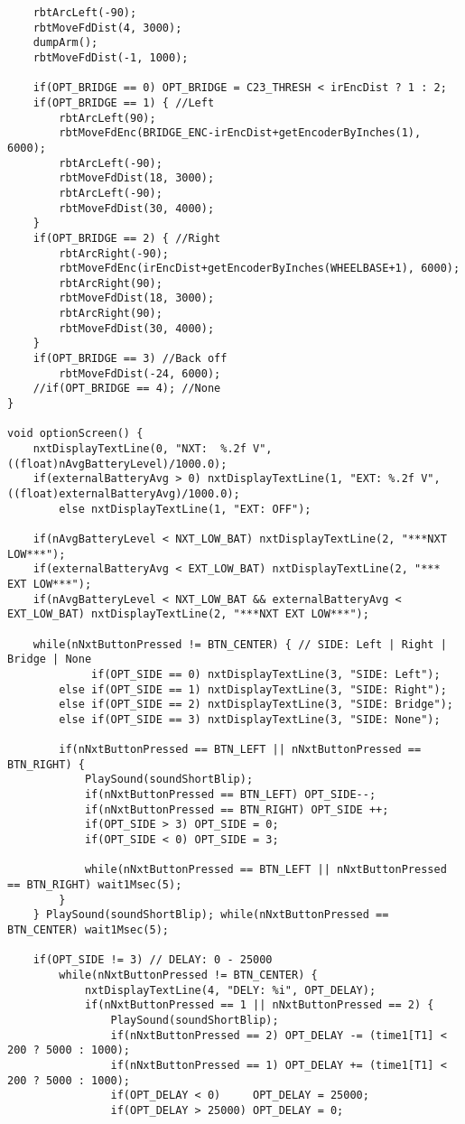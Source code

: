 \begin{lstlisting}
	rbtArcLeft(-90);
	rbtMoveFdDist(4, 3000);
	dumpArm();
	rbtMoveFdDist(-1, 1000);

	if(OPT_BRIDGE == 0) OPT_BRIDGE = C23_THRESH < irEncDist ? 1 : 2;
	if(OPT_BRIDGE == 1) { //Left
		rbtArcLeft(90);
		rbtMoveFdEnc(BRIDGE_ENC-irEncDist+getEncoderByInches(1), 6000);
		rbtArcLeft(-90);
		rbtMoveFdDist(18, 3000);
		rbtArcLeft(-90);
		rbtMoveFdDist(30, 4000);
	}
	if(OPT_BRIDGE == 2) { //Right
		rbtArcRight(-90);
		rbtMoveFdEnc(irEncDist+getEncoderByInches(WHEELBASE+1), 6000);
		rbtArcRight(90);
		rbtMoveFdDist(18, 3000);
		rbtArcRight(90);
		rbtMoveFdDist(30, 4000);
	}
	if(OPT_BRIDGE == 3) //Back off
		rbtMoveFdDist(-24, 6000);
	//if(OPT_BRIDGE == 4); //None
}

void optionScreen() {
	nxtDisplayTextLine(0, "NXT:  %.2f V", ((float)nAvgBatteryLevel)/1000.0);
	if(externalBatteryAvg > 0) nxtDisplayTextLine(1, "EXT: %.2f V", ((float)externalBatteryAvg)/1000.0);
		else nxtDisplayTextLine(1, "EXT: OFF");

	if(nAvgBatteryLevel < NXT_LOW_BAT) nxtDisplayTextLine(2, "***NXT     LOW***");
	if(externalBatteryAvg < EXT_LOW_BAT) nxtDisplayTextLine(2, "***    EXT LOW***");
	if(nAvgBatteryLevel < NXT_LOW_BAT && externalBatteryAvg < EXT_LOW_BAT) nxtDisplayTextLine(2, "***NXT EXT LOW***");

	while(nNxtButtonPressed != BTN_CENTER) { // SIDE: Left | Right | Bridge | None
		     if(OPT_SIDE == 0) nxtDisplayTextLine(3, "SIDE: Left");
		else if(OPT_SIDE == 1) nxtDisplayTextLine(3, "SIDE: Right");
		else if(OPT_SIDE == 2) nxtDisplayTextLine(3, "SIDE: Bridge");
		else if(OPT_SIDE == 3) nxtDisplayTextLine(3, "SIDE: None");

		if(nNxtButtonPressed == BTN_LEFT || nNxtButtonPressed == BTN_RIGHT) {
			PlaySound(soundShortBlip);
			if(nNxtButtonPressed == BTN_LEFT) OPT_SIDE--;
			if(nNxtButtonPressed == BTN_RIGHT) OPT_SIDE ++;
			if(OPT_SIDE > 3) OPT_SIDE = 0;
			if(OPT_SIDE < 0) OPT_SIDE = 3;

			while(nNxtButtonPressed == BTN_LEFT || nNxtButtonPressed == BTN_RIGHT) wait1Msec(5);
		}
	} PlaySound(soundShortBlip); while(nNxtButtonPressed == BTN_CENTER) wait1Msec(5);

	if(OPT_SIDE != 3) // DELAY: 0 - 25000
		while(nNxtButtonPressed != BTN_CENTER) {
			nxtDisplayTextLine(4, "DELY: %i", OPT_DELAY);
			if(nNxtButtonPressed == 1 || nNxtButtonPressed == 2) {
				PlaySound(soundShortBlip);
				if(nNxtButtonPressed == 2) OPT_DELAY -= (time1[T1] < 200 ? 5000 : 1000);
				if(nNxtButtonPressed == 1) OPT_DELAY += (time1[T1] < 200 ? 5000 : 1000);
				if(OPT_DELAY < 0)     OPT_DELAY = 25000;
				if(OPT_DELAY > 25000) OPT_DELAY = 0;


\end{lstlisting}

